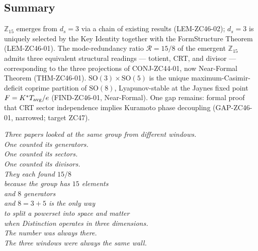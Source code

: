 \documentclass[12pt, a4paper]{article}
\begin{document}
\subsection{Summary}


\begin{keybox}[title={ZC46 v2 in Four Sentences}]
$\mathbb{Z}_{15}$ emerges from $d_s = 3$ via a chain of existing
results (LEM-ZC46-02); $d_s = 3$ is uniquely selected by the
Key Identity together with the FormStructure Theorem (LEM-ZC46-01).
The mode-redundancy ratio $\mathcal{R} = 15/8$ of the emergent
$\mathbb{Z}_{15}$ admits three equivalent structural readings ---
totient, CRT, and divisor --- corresponding to the three
projections of CONJ-ZC44-01, now Near-Formal Theorem (THM-ZC46-01).
$\mathrm{SO}(3)\times\mathrm{SO}(5)$ is the unique maximum-Casimir-deficit
coprime partition of $\mathrm{SO}(8)$, Lyapunov-stable at the Jaynes
fixed point $F = K^*T_{\rm avg}/e$ (FIND-ZC46-01, Near-Formal).
One gap remains: formal proof that CRT sector independence implies
Kuramoto phase decoupling (GAP-ZC46-01, narrowed; target ZC47).
\end{keybox}

\bigskip
\begin{center}
\textit{%
Three papers looked at the same group from different windows.\\[0.3em]
One counted its generators.\\
One counted its sectors.\\
One counted its divisors.\\[0.3em]
They each found $15/8$\\
because the group has $15$ elements\\
and $8$ generators\\
and $8 = 3 + 5$ is the only way\\
to split a powerset into space and matter\\
when Distinction operates in three dimensions.\\[0.3em]
The number was always there.\\
The three windows were always the same wall.}
\end{center}

\newpage
\end{document}
